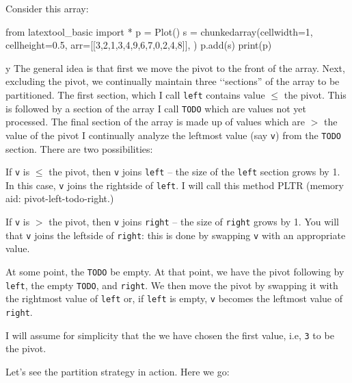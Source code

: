 Consider this array:

\begin{python}
from latextool_basic import *
p = Plot()
s = chunkedarray(cellwidth=1, 
                   cellheight=0.5,
                   arr=[[3,2,1,3,4,9,6,7,0,2,4,8]],
)
p.add(s)
print(p)
\end{python}

y
The general idea is that first we move the pivot to the front of the
array.
Next, excluding the pivot, we continually maintain three \lq\lq sections''
of the array to be partitioned.
The first section, which I call \verb!left! contains value
$\leq$ the pivot.
This is followed by a section of the array I call \verb!TODO!
which are values not yet processed.
The final section of the array is made up of values
which are $>$ the value of the pivot
I continually analyze the leftmost value (say \verb!v!) from the
\verb!TODO! section.
There are two possibilities:

If \verb!v! is $\leq$ the pivot, then \verb!v! joins \verb!left! --
the size of the \verb!left! section grows by 1.
In this case, \verb!v! joins the rightside of \verb!left!.
I will call this method PLTR (memory aid: pivot-left-todo-right.)

If \verb!v! is $>$ the pivot, then \verb!v! joins \verb!right! --
the size of \verb!right! grows by 1.
You will that \verb!v! joins the leftside of \verb!right!:
this is done by swapping \verb!v! with an appropriate value.

At some point, the \verb!TODO! be empty.
At that point, we have the pivot following by \verb!left!,
the empty \verb!TODO!, and \verb!right!.
We then move the pivot by swapping it with the rightmost
value of \verb!left! or, if \verb!left! is empty,
\verb!v! becomes the leftmost value of \verb!right!.

I will assume for simplicity that the we have chosen the first value,
i.e, \verb!3! to be the pivot.

Let's see the partition strategy in action.
Here we go:


